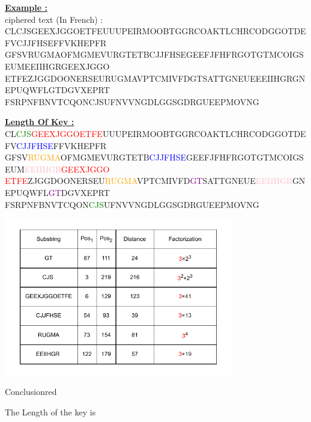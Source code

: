 \newpage
\textbf{\underline{Example :}}\\[0.25cm]
ciphered text (In French) :\\[0.15cm]
CLCJSGEEXJGGOETFEUUUPEIRMOOBTGGRCOAKTLCHRCODGGOTDEFVCJJFHSEFFVKHEPFR\\
GFSVRUGMAOFMGMEVURGTETBCJJFHSEGEEFJFHFRGOTGTMCOIGSEUMEEIIHGRGEEXJGGO\\
ETFEZJGGDOONERSEURUGMAVPTCMIVFDGTSATTGNEUEEEIIHGRGNEPUQWFLGTDGVXEPRT\\
FSRPNFBNVTCQONCJSUFNVVNGDLGGSGDRGUEEPMOVNG

\vspace{0.25cm}
\textbf{\underline{Length Of Key :}}\\[0.25cm]
CL\textcolor{green}{CJS}\textcolor{red}{GEEXJGGOETFE}UUUPEIRMOOBTGGRCOAKTLCHRCODGGOTDEFV\textcolor{blue}{CJJFHSE}FFVKHEPFR\\
GFSV\textcolor{orange}{RUGMA}OFMGMEVURGTETB\textcolor{blue}{CJJFHSE}GEEFJFHFRGOTGTMCOIGSEUM\textcolor{pink}{EEIIHGR}\textcolor{red}{GEEXJGGO}\\
\textcolor{red}{ETFE}ZJGGDOONERSEU\textcolor{orange}{RUGMA}VPTCMIVFD\textcolor{purple}{GT}SATTGNEUE\textcolor{pink}{EEIIHGR}GNEPUQWFL\textcolor{purple}{GT}DGVXEPRT\\
FSRPNFBNVTCQON\textcolor{green}{CJS}UFNVVNGDLGGSGDRGUEEPMOVNG

\vspace{0.25cm}

\begin{center}
    \includegraphics[width=0.75\textwidth]{Chapters/Diagram/Crypto/l.drawio.pdf}
\end{center}


\vspace{0.25cm}
\begin{prettyBox}{Conclusion}{red}
\begin{center}
    The Length of the key is 
\end{center}
\end{prettyBox}


